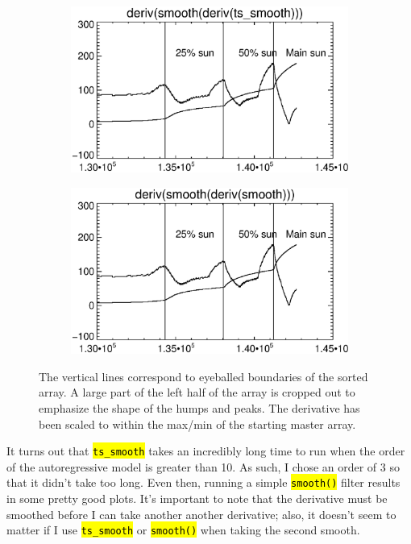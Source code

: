 \documentclass[10pt]{article}
\begin{document}
\begin{figure}[!ht]
    \hspace{-1.0in}
    \begin{subfigure}[b]{.45\linewidth}
        \centering
        \includegraphics[width=1.3\textwidth]{plots_tables_images/d_s_d_ts.eps}
    \end{subfigure}
    \hspace{.5in}
    \begin{subfigure}[b]{.45\linewidth}
        \centering
        \includegraphics[width=1.3\textwidth]{plots_tables_images/d_s_d_reg.eps}
    \end{subfigure}
    \caption{The vertical lines correspond to eyeballed boundaries of the sorted array. A large part of the left half of the array is cropped out to emphasize the shape of the humps and peaks. The derivative has been scaled to within the max/min of the starting master array.}
    \label{comps}
\end{figure}

It turns out that \texttt{\hl{ts\_smooth}} takes an incredibly long time to run when the order of the autoregressive model is greater than 10. As such, I chose an order of 3 so that it didn't take too long. Even then, running a simple \hl{\texttt{smooth()}} filter results in some pretty good plots. It's important to note that the derivative must be smoothed before I can take another another derivative; also, it doesn't seem to matter if I use \texttt{\hl{ts\_smooth}} or \hl{\texttt{smooth()}} when taking the second smooth.
\end{document}
